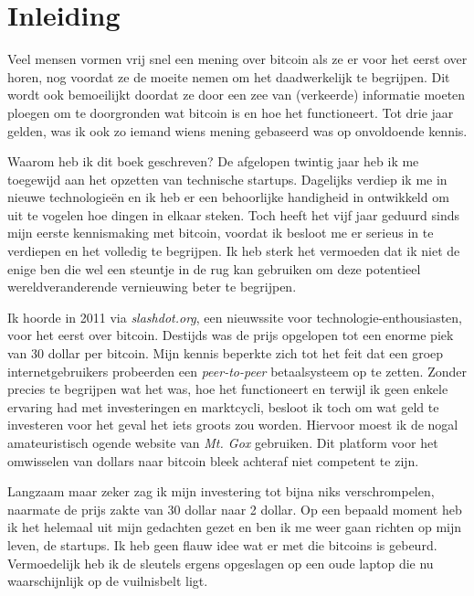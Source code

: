 \chapter{Inleiding}

\vspace{-1\baselineskip}
Veel mensen vormen vrij snel een mening over bitcoin als ze er voor het eerst over horen, nog voordat ze de moeite nemen om het daadwerkelijk te begrijpen. Dit wordt ook bemoeilijkt doordat ze door een zee van (verkeerde) informatie moeten ploegen om te doorgronden wat bitcoin is en hoe het functioneert. Tot drie jaar gelden, was ik ook zo iemand wiens mening gebaseerd was op onvoldoende kennis.

Waarom heb ik dit boek geschreven? De afgelopen twintig jaar heb ik me toegewijd aan het opzetten van technische startups. Dagelijks verdiep ik me in nieuwe technologieën en ik heb er een behoorlijke handigheid in ontwikkeld om uit te vogelen hoe dingen in elkaar steken. Toch heeft het vijf jaar geduurd sinds mijn eerste kennismaking met bitcoin, voordat ik besloot me er serieus in te verdiepen en het volledig te begrijpen. Ik heb sterk het vermoeden dat ik niet de enige ben die wel een steuntje in de rug kan gebruiken om deze potentieel wereldveranderende vernieuwing beter te begrijpen.

Ik hoorde in 2011 via \textit{slashdot.org}, een nieuwssite voor technologie-enthousiasten, voor het eerst over bitcoin. Destijds was de prijs opgelopen tot een enorme piek van 30 dollar per bitcoin. Mijn kennis beperkte zich tot het feit dat een groep internetgebruikers probeerden een \textit{peer-to-peer} betaalsysteem op te zetten. Zonder precies te begrijpen wat het was, hoe het functioneert en terwijl ik geen enkele ervaring had met investeringen en marktcycli, besloot ik toch om wat geld te investeren voor het geval het iets groots zou worden. Hiervoor moest ik de nogal amateuristisch ogende website van \textit{Mt. Gox} gebruiken. Dit platform voor het omwisselen van dollars naar bitcoin bleek achteraf niet competent te zijn.

Langzaam maar zeker zag ik mijn investering tot bijna niks verschrompelen, naarmate de prijs zakte van 30 dollar naar 2 dollar. Op een bepaald moment heb ik het helemaal uit mijn gedachten gezet en ben ik me weer gaan richten op mijn leven, de startups. Ik heb geen flauw idee wat er met die bitcoins is gebeurd. Vermoedelijk heb ik de sleutels ergens opgeslagen op een oude laptop die nu waarschijnlijk op de vuilnisbelt ligt.

